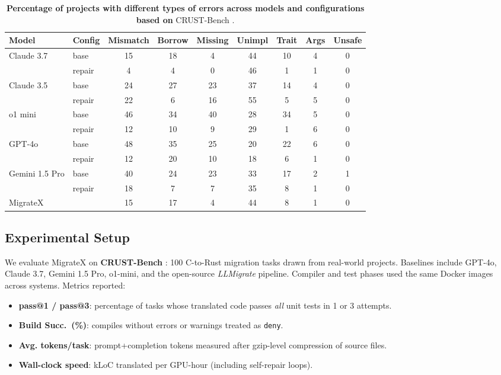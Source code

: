 \documentclass[twocolumn]{article}
\begin{document}
    \begin{table}[htbp]
        \centering
        \caption{\textbf{Percentage of projects with different types of errors across models and configurations based on }CRUST-Bench \cite{khatry2025crust}.}
        \label{tab:error_comparison}
        \begin{tabular}{l l | c c c c c c c}
        \toprule
        \textbf{Model} & \textbf{Config} & \textbf{Mismatch} & \textbf{Borrow} & \textbf{Missing} & \textbf{Unimpl} & \textbf{Trait} & \textbf{Args} & \textbf{Unsafe} \\
        \midrule
        Claude 3.7 & base & 15 & 18 & 4 & 44 & 10 & 4 & 0 \\
                   & repair & 4 & 4 & 0 & 46 & 1 & 1 & 0 \\
        Claude 3.5 & base & 24 & 27 & 23 & 37 & 14 & 4 & 0 \\
                   & repair & 22 & 6 & 16 & 55 & 5 & 5 & 0 \\
        o1 mini & base & 46 & 34 & 40 & 28 & 34 & 5 & 0 \\
                & repair & 12 & 10 & 9 & 29 & 1 & 6 & 0 \\
        GPT-4o & base & 48 & 35 & 25 & 20 & 22 & 6 & 0 \\
               & repair & 12 & 20 & 10 & 18 & 6 & 1 & 0 \\
        Gemini 1.5 Pro & base & 40 & 24 & 23 & 33 & 17 & 2 & 1 \\
                       & repair & 18 & 7 & 7 & 35 & 8 & 1 & 0 \\
        MigrateX & & 15 & 17 & 4 & 44 & 8 & 1 & 0 \\
        \bottomrule
        \end{tabular}
        \end{table}

    \subsection{Experimental Setup}
    \label{subsec:setup}
    We evaluate MigrateX on \textbf{CRUST-Bench} \cite{khatry2025crust}: 100 C-to-Rust migration tasks drawn from real-world projects.
    Baselines include GPT-4o, Claude 3.7, Gemini 1.5 Pro, o1-mini, and the open-source \emph{LLMigrate} pipeline. Compiler and test phases used the same Docker images across systems.  
    Metrics reported:
    \begin{itemize}
      \item \textbf{pass@1 / pass@3}: percentage of tasks whose translated code passes \emph{all} unit tests in 1 or 3 attempts.
      \item \textbf{Build Succ.~(\%)}: compiles without errors or warnings treated as \texttt{deny}.
      \item \textbf{Avg. tokens/task}: prompt+completion tokens measured after gzip-level compression of source files.
      \item \textbf{Wall-clock speed}: kLoC translated per GPU-hour (including self-repair loops).
    \end{itemize}
\end{document}
